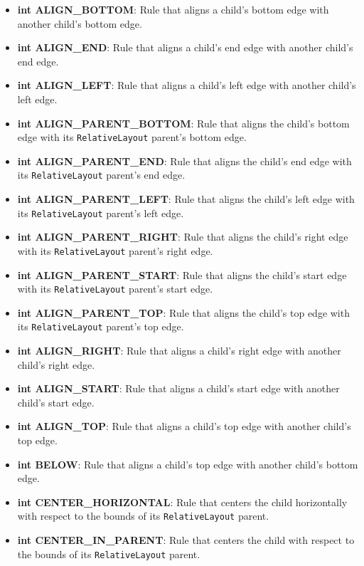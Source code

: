 \documentclass{report}
\begin{document}
\begin{itemize}
\begin{itemize}
                \item \textbf{int ALIGN\_BOTTOM}: Rule that aligns a child's bottom edge with another child's bottom edge.
                \item \textbf{int ALIGN\_END}: Rule that aligns a child's end edge with another child's end edge.
                \item \textbf{int ALIGN\_LEFT}: Rule that aligns a child's left edge with another child's left edge.
                \item \textbf{int ALIGN\_PARENT\_BOTTOM}: Rule that aligns the child's bottom edge with its \texttt{RelativeLayout} parent's bottom edge.
                \item \textbf{int ALIGN\_PARENT\_END}: Rule that aligns the child's end edge with its \texttt{RelativeLayout} parent's end edge.
                \item \textbf{int ALIGN\_PARENT\_LEFT}: Rule that aligns the child's left edge with its \texttt{RelativeLayout} parent's left edge.
                \item \textbf{int ALIGN\_PARENT\_RIGHT}: Rule that aligns the child's right edge with its \texttt{RelativeLayout} parent's right edge.
                \item \textbf{int ALIGN\_PARENT\_START}: Rule that aligns the child's start edge with its \texttt{RelativeLayout} parent's start edge.
                \item \textbf{int ALIGN\_PARENT\_TOP}: Rule that aligns the child's top edge with its \texttt{RelativeLayout} parent's top edge.
                \item \textbf{int ALIGN\_RIGHT}: Rule that aligns a child's right edge with another child's right edge.
                \item \textbf{int ALIGN\_START}: Rule that aligns a child's start edge with another child's start edge.
                \item \textbf{int ALIGN\_TOP}: Rule that aligns a child's top edge with another child's top edge.
                \item \textbf{int BELOW}: Rule that aligns a child's top edge with another child's bottom edge.
                \item \textbf{int CENTER\_HORIZONTAL}: Rule that centers the child horizontally with respect to the bounds of its \texttt{RelativeLayout} parent.
                \item \textbf{int CENTER\_IN\_PARENT}: Rule that centers the child with respect to the bounds of its \texttt{RelativeLayout} parent.

\end{itemize}
\end{itemize}
\end{document}
